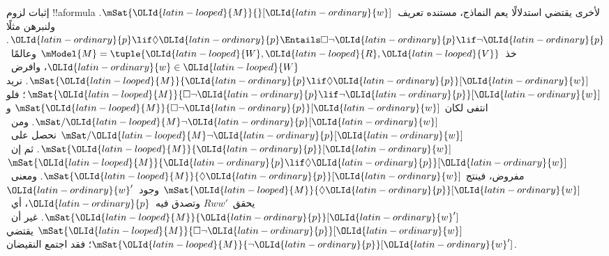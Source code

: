 \documentclass[../../../include/open-logic-section]{subfiles}
\begin{document}
\begin{ex}
  إثبات لزوم !!a{formula} لأخرى يقتضي استدلالًا يعم النماذج،
  مستنده تعريف~$\mSat{\OLId{latin-looped}{M}}{}[\OLId{latin-ordinary}{w}]$. ولنبرهن مثلًا
  $\OLId{latin-ordinary}{p} \lif \Diamond \OLId{latin-ordinary}{p} \Entails \Box\lnot \OLId{latin-ordinary}{p} \lif \lnot \OLId{latin-ordinary}{p}$.
  خذ~$\mModel{M} = \tuple{\OLId{latin-looped}{W}, \OLId{latin-looped}{R}, \OLId{latin-looped}{V}}$ وعالمًا~$\OLId{latin-ordinary}{w} \in \OLId{latin-looped}{W}$،
  وافرض~$\mSat{\OLId{latin-looped}{M}}{\OLId{latin-ordinary}{p} \lif \Diamond \OLId{latin-ordinary}{p}}[\OLId{latin-ordinary}{w}]$. نريد
  $\mSat{\OLId{latin-looped}{M}}{\Box\lnot \OLId{latin-ordinary}{p} \lif \lnot \OLId{latin-ordinary}{p}}[\OLId{latin-ordinary}{w}]$؛ فلو انتفى لكان
  $\mSat{\OLId{latin-looped}{M}}{\Box\lnot \OLId{latin-ordinary}{p}}[\OLId{latin-ordinary}{w}]$ و$\mSat/{\OLId{latin-looped}{M}}{\lnot \OLId{latin-ordinary}{p}}[\OLId{latin-ordinary}{w}]$.
  ومن~$\mSat/{\OLId{latin-looped}{M}}{\lnot \OLId{latin-ordinary}{p}}[\OLId{latin-ordinary}{w}]$ نحصل على~$\mSat{\OLId{latin-looped}{M}}{\OLId{latin-ordinary}{p}}[\OLId{latin-ordinary}{w}]$.
  ثم إن~$\mSat{\OLId{latin-looped}{M}}{\OLId{latin-ordinary}{p} \lif \Diamond \OLId{latin-ordinary}{p}}[\OLId{latin-ordinary}{w}]$ مفروض، فينتج
  $\mSat{\OLId{latin-looped}{M}}{\Diamond \OLId{latin-ordinary}{p}}[\OLId{latin-ordinary}{w}]$. ومعنى~$\mSat{\OLId{latin-looped}{M}}{\Diamond \OLId{latin-ordinary}{p}}[\OLId{latin-ordinary}{w}]$
  وجود~$\OLId{latin-ordinary}{w}'$ يحقق~$Rww'$ وتصدق فيه~$\OLId{latin-ordinary}{p}$، أي~$\mSat{\OLId{latin-looped}{M}}{\OLId{latin-ordinary}{p}}[\OLId{latin-ordinary}{w}']$.
  غير أن~$\mSat{\OLId{latin-looped}{M}}{\Box \lnot \OLId{latin-ordinary}{p}}[\OLId{latin-ordinary}{w}]$ يقتضي
  $\mSat{\OLId{latin-looped}{M}}{\lnot \OLId{latin-ordinary}{p}}[\OLId{latin-ordinary}{w}']$؛ فقد اجتمع النقيضان.


\end{ex}
\end{document}

